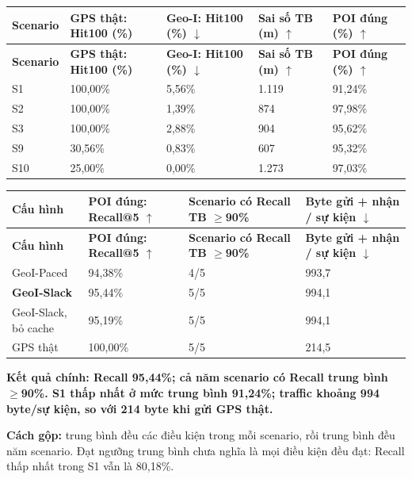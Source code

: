 \documentclass[10pt,a4paper]{article}
\newcommand{\key}[1]{\par\smallskip\noindent\colorbox{pale}{\parbox{\dimexpr\linewidth-2\fboxsep}{\textbf{#1}}}\par\smallskip}
\begin{document}
\begingroup\small
\begin{longtable}{@{}P{1.618cm}P{3.741cm}P{3.741cm}P{3.640cm}P{3.336cm}@{}}
\toprule
\textbf{Scenario} & \textbf{GPS thật: Hit100 (\%)} & \textbf{Geo-I: Hit100 (\%) $\downarrow$} & \textbf{Sai số TB (m) $\uparrow$} & \textbf{POI đúng (\%) $\uparrow$}\\\midrule
\endfirsthead
\toprule
\textbf{Scenario} & \textbf{GPS thật: Hit100 (\%)} & \textbf{Geo-I: Hit100 (\%) $\downarrow$} & \textbf{Sai số TB (m) $\uparrow$} & \textbf{POI đúng (\%) $\uparrow$}\\\midrule
\endhead
\bottomrule\endfoot
S1 & 100,00\% & 5,56\% & 1.119 & 91,24\%\\
\addlinespace[3pt]
S2 & 100,00\% & 1,39\% & 874 & 97,98\%\\
\addlinespace[3pt]
S3 & 100,00\% & 2,88\% & 904 & 95,62\%\\
\addlinespace[3pt]
S9 & 30,56\% & 0,83\% & 607 & 95,32\%\\
\addlinespace[3pt]
S10 & 25,00\% & 0,00\% & 1.273 & 97,03\%\\
\end{longtable}
\endgroup
\begingroup\small
\begin{longtable}{@{}P{4.839cm}P{3.581cm}P{3.194cm}P{4.742cm}@{}}
\toprule
\textbf{Cấu hình} & \textbf{POI đúng: Recall@5 $\uparrow$} & \textbf{Scenario có Recall TB $\ge$90\%} & \textbf{Byte gửi + nhận / sự kiện $\downarrow$}\\\midrule
\endfirsthead
\toprule
\textbf{Cấu hình} & \textbf{POI đúng: Recall@5 $\uparrow$} & \textbf{Scenario có Recall TB $\ge$90\%} & \textbf{Byte gửi + nhận / sự kiện $\downarrow$}\\\midrule
\endhead
\bottomrule\endfoot
GeoI-Paced & 94,38\% & 4/5 & 993,7\\
\addlinespace[3pt]
\textbf{GeoI-Slack} & 95,44\% & 5/5 & 994,1\\
\addlinespace[3pt]
GeoI-Slack, bỏ cache & 95,19\% & 5/5 & 994,1\\
\addlinespace[3pt]
GPS thật & 100,00\% & 5/5 & 214,5\\
\end{longtable}
\endgroup
\key{Kết quả chính: Recall 95,44\%; cả năm scenario có Recall trung bình $\ge$90\%. S1 thấp nhất ở mức trung bình 91,24\%; traffic khoảng 994 byte/sự kiện, so với 214 byte khi gửi GPS thật.}

\textbf{Cách gộp:} trung bình đều các điều kiện trong mỗi scenario, rồi trung bình đều năm scenario. Đạt ngưỡng trung bình chưa nghĩa là mọi điều kiện đều đạt: Recall thấp nhất trong S1 vẫn là 80,18\%.
\end{document}
